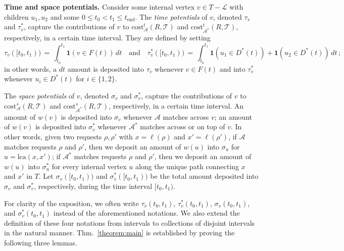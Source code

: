 \documentclass[11pt]{article}
\def\ShortVersion{}
\def\ShortVersionEnd{}
\renewcommand{\paragraph}[1]{\par\noindent\textbf{#1}}
\theoremstyle{definition}
\theoremstyle{plain}
\theoremstyle{definition}
\theoremstyle{plain}
\theoremstyle{definition}
\theoremstyle{plain}
\newcommand{\NotationLabel}[1]{\label{notationTable:#1}\ignorespaces}
\newcommand{\Thm}{Thm.}
\newcommand{\Location}{\ell}
\newcommand{\sCost}{\mathrm{cost}^{\mathit{s}}}
\newcommand{\tCost}{\mathrm{cost}^{\mathit{t}}}
\newcommand{\Leaves}{\mathcal{L}}
\newcommand{\LCA}{\mathrm{lca}}
\newcommand{\Indicator}{\mathbf{1}}
\newcommand{\EndTime}{\mathit{t}_{\mathrm{end}}}
\newcommand{\Odd}{\mathit{D}}
\newcommand{\Effective}{\mathit{F}}
\newcommand{\A}{\mathcal{A}}
\newcommand{\adv}[1]{{#1}^{*}}
\begin{document}
\paragraph{Time and space potentials.}
Consider some internal vertex $v \in T - \Leaves$ with children $u_{1},
u_{2}$ and some
$0 \leq t_{0} < t_{1} \leq \EndTime$.
The \emph{time potentials} of $v$, denoted $\tau_{v}$
and $\adv{\tau}_{v}$,
capture the contributions of $v$ to $\tCost_{\A}(R, \mathcal{T})$ and
$\tCost_{\adv{\A}}(R, \mathcal{T})$, respectively, in a certain time interval.
They are defined by setting
\[
\tau_{v}([t_{0}, t_{1}))
\, = \,
\int_{t_{0}}^{t_{1}} \Indicator(v \in \Effective(t)) \, d t
\quad \text{and} \quad
\adv{\tau}_{v}([t_{0}, t_{1}))
\, = \,
\int_{t_{0}}^{t_{1}} \Indicator(u_{1} \in \adv{\Odd}(t)) + \Indicator(u_{2}
\in \adv{\Odd}(t)) \, d t \, ;
\]
\NotationLabel{analysis:tau}
\NotationLabel{analysis:adv-tau}
in other words, a $d t$ amount is deposited into $\tau_{v}$ whenever $v \in
\Effective(t)$ and into $\adv{\tau}_{v}$ whenever $u_{i} \in \adv{\Odd}(t)$
for $i \in \{ 1, 2 \}$.

\ShortVersion \sloppy \ShortVersionEnd
The \emph{space potentials} of $v$, denoted $\sigma_{v}$
\NotationLabel{analysis:sigma}
and $\adv{\sigma}_{v}$,
\NotationLabel{analysis:adv-sigma}
capture the contributions of $v$ to $\sCost_{\A}(R, \mathcal{T})$ and
$\sCost_{\adv{\A}}(R, \mathcal{T})$, respectively, in a certain time interval.
An amount of $w(v)$ is deposited into $\sigma_{v}$ whenever $\A$ matches
across $v$;
an amount of $w(v)$ is deposited into $\adv{\sigma}_{v}$ whenever
$\adv{\A}$ matches across or on top of $v$.
In other words, given two requests $\rho, \rho'$ with
$x = \Location(\rho)$
and
$x' = \Location(\rho')$,
if $\A$ matches requests $\rho$ and $\rho'$,
then we deposit an amount of $w(u)$ into $\sigma_{u}$ for
$u = \LCA(x, x')$;
if $\adv{\A}$ matches requests $\rho$ and $\rho'$,
then we deposit an amount of $w(u)$ into $\adv{\sigma}_{u}$ for every internal
vertex $u$ along the unique path connecting $x$ and $x'$ in $T$.
Let $\sigma_{v}([t_{0}, t_{1}))$ and $\adv{\sigma}_{v}([t_{0}, t_{1}))$ be the
total amount deposited into $\sigma_{v}$ and $\adv{\sigma}_{v}$, respectively,
during the time interval $[t_{0}, t_{1})$.
\ShortVersion \par\fussy \ShortVersionEnd

For clarity of the exposition, we often write $\tau_{v}(t_{0}, t_{1})$,
$\adv{\tau}_{v}(t_{0}, t_{1})$, $\sigma_{v}(t_{0}, t_{1})$, and
$\adv{\sigma}_{v}(t_{0}, t_{1})$ instead of the aforementioned notations.
We also extend the definition of these four notations from intervals to
collections of disjoint intervals in the natural manner.
\Thm{}~\ref{theorem:main} is established by proving the following three
lemmas.
\end{document}
